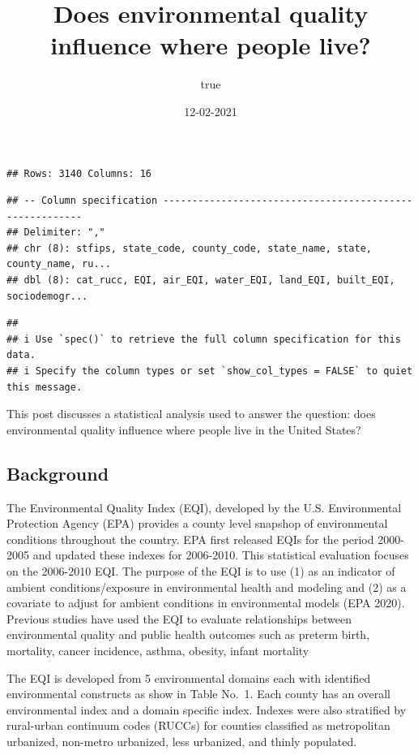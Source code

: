 \documentclass[
]{article}
\title{Does environmental quality influence where people live?}
\author{true}
\date{12-02-2021}
\begin{document}
\maketitle

{
\setcounter{tocdepth}{2}
\tableofcontents
}
\begin{verbatim}
## Rows: 3140 Columns: 16
\end{verbatim}

\begin{verbatim}
## -- Column specification --------------------------------------------------------
## Delimiter: ","
## chr (8): stfips, state_code, county_code, state_name, state, county_name, ru...
## dbl (8): cat_rucc, EQI, air_EQI, water_EQI, land_EQI, built_EQI, sociodemogr...
\end{verbatim}

\begin{verbatim}
## 
## i Use `spec()` to retrieve the full column specification for this data.
## i Specify the column types or set `show_col_types = FALSE` to quiet this message.
\end{verbatim}

This post discusses a statistical analysis used to answer the question:
does environmental quality influence where people live in the United
States?

\hypertarget{background}{%
\subsection{Background}\label{background}}

The Environmental Quality Index (EQI), developed by the U.S.
Environmental Protection Agency (EPA) provides a county level snapshop
of environmental conditions throughout the country. EPA first released
EQIs for the period 2000-2005 and updated these indexes for 2006-2010.
This statistical evaluation focuses on the 2006-2010 EQI. The purpose of
the EQI is to use (1) as an indicator of ambient conditions/exposure in
environmental health and modeling and (2) as a covariate to adjust for
ambient conditions in environmental models (EPA 2020). Previous studies
have used the EQI to evaluate relationships between environmental
quality and public health outcomes such as preterm birth, mortality,
cancer incidence, asthma, obesity, infant mortality

The EQI is developed from 5 environmental domains each with identified
environmental constructs as show in Table No.~1. Each county has an
overall environmental index and a domain specific index. Indexes were
also stratified by rural-urban continuum codes (RUCCs) for counties
classified as metropolitan urbanized, non-metro urbanized, less
urbanized, and thinly populated.
\end{document}
